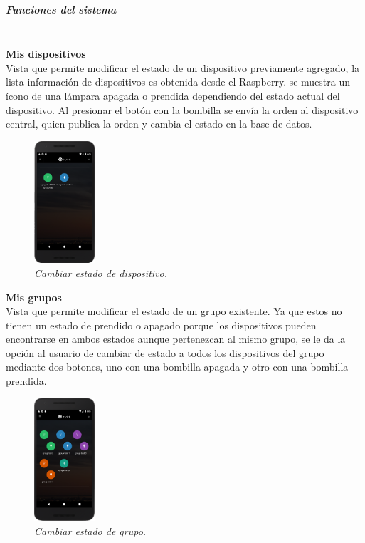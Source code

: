 \subparagraph{Funciones del sistema}\mbox{}\\

\textbf{Mis dispositivos}\\
Vista que permite modificar el estado de un dispositivo previamente agregado, la lista información de dispositivos es obtenida desde el Raspberry. se muestra un ícono de una lámpara apagada o prendida dependiendo del estado actual del dispositivo. Al presionar el botón con la bombilla se envía la orden al dispositivo central, quien publica la orden y cambia el estado en la base de datos.

\begin{figure}[H]
  \centering
  \includegraphics[width=0.2\textwidth, keepaspectratio]{images/app-movil-choose-device}
  \caption{\textit{Cambiar estado de dispositivo.}}
  \label{fig:app-movil-choose-device}
\end{figure}

\textbf{Mis grupos}\\
Vista que permite modificar el estado de un grupo existente. Ya que estos no tienen un estado de prendido o apagado porque los dispositivos pueden encontrarse en ambos estados aunque pertenezcan al mismo grupo, se le da la opción al usuario de cambiar de estado a todos los dispositivos del grupo mediante dos botones, uno con una bombilla apagada y otro con una bombilla prendida.

\begin{figure}[H]
  \centering
  \includegraphics[width=0.2\textwidth, keepaspectratio]{images/app-movil-control-group}
  \caption{\textit{Cambiar estado de grupo.}}
  \label{fig:app-movil-control-group}
\end{figure}


